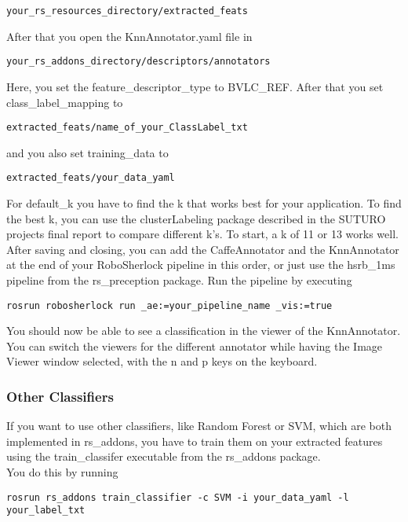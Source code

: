 \documentclass[main.tex]{subfiles}
\begin{document}
\begin{lstlisting}
your_rs_resources_directory/extracted_feats
\end{lstlisting}

After that you open the KnnAnnotator.yaml file in
\begin{lstlisting}
your_rs_addons_directory/descriptors/annotators
\end{lstlisting}
 
Here, you set the feature\_descriptor\_type to BVLC\_REF. After that you set class\_label\_mapping to

\begin{lstlisting}
extracted_feats/name_of_your_ClassLabel_txt
\end{lstlisting}

and you also set training\_data to


\begin{lstlisting}
extracted_feats/your_data_yaml
\end{lstlisting}

For default\_k you have to find the k that works best for your application. To find the best k, you can use the clusterLabeling package described in the SUTURO projects final report to compare different k's. To start, a k of 11 or 13 works well. After saving and closing, you can add the CaffeAnnotator and the KnnAnnotator at the end of your RoboSherlock pipeline in this order, or just use the hsrb\_1ms pipeline from the rs\_preception package. Run the pipeline by executing
\begin{lstlisting}
rosrun robosherlock run _ae:=your_pipeline_name _vis:=true
\end{lstlisting}

You should now be able to see a classification in the viewer of the KnnAnnotator. You can switch the viewers for the different annotator while having the Image Viewer window selected, with the n and p keys on the keyboard.

 
\subsubsection{Other Classifiers}
If you want to use other classifiers, like Random Forest or SVM, which are both implemented in rs\_addons, you have to train them on your extracted features using the train\_classifer executable from the rs\_addons package.\\

You do this by running 

\begin{lstlisting}
rosrun rs_addons train_classifier -c SVM -i your_data_yaml -l your_label_txt
\end{lstlisting}
\end{document}
